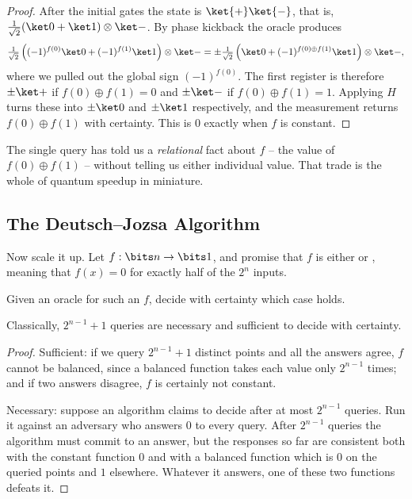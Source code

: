 \begin{proof}
	After the initial gates the state is $\ket{+}\ket{-}$, that is, $\tfrac1{\sqrt2}(\ket0+\ket1)\otimes\ket-$. By phase kickback the oracle produces
	$$\tfrac{1}{\sqrt2}\left((-1)^{f(0)}\ket0 + (-1)^{f(1)}\ket1\right)\otimes\ket-= \pm\tfrac{1}{\sqrt2}\left(\ket0+(-1)^{f(0)\oplus f(1)}\ket1\right)\otimes\ket-,$$
	where we pulled out the global sign $(-1)^{f(0)}$. The first register is therefore $\pm\ket+$ if $f(0)\oplus f(1) = 0$ and $\pm\ket-$ if $f(0)\oplus f(1)=1$. Applying $H$ turns these into $\pm\ket0$ and $\pm\ket1$ respectively, and the measurement returns $f(0)\oplus f(1)$ with certainty. This is $0$ exactly when $f$ is constant.
\end{proof}

The single query has told us a \emph{relational} fact about $f$ -- the value of $f(0)\oplus f(1)$ -- without telling us either individual value. That trade is the whole of quantum speedup in miniature.

\subsection{The Deutsch--Jozsa Algorithm}

Now scale it up. Let $f:\bits n\to\bits1$, and promise that $f$ is either  or , meaning that $f(x) = 0$ for exactly half of the $2^n$ inputs.

\begin{problem*}
	Given an oracle for such an $f$, decide with certainty which case holds.
\end{problem*}

\begin{proposition}
	Classically, $2^{n-1}+1$ queries are necessary and sufficient to decide with certainty.
\end{proposition}

\begin{proof}
	Sufficient: if we query $2^{n-1}+1$ distinct points and all the answers agree, $f$ cannot be balanced, since a balanced function takes each value only $2^{n-1}$ times; and if two answers disagree, $f$ is certainly not constant.

	Necessary: suppose an algorithm claims to decide after at most $2^{n-1}$ queries. Run it against an adversary who answers $0$ to every query. After $2^{n-1}$ queries the algorithm must commit to an answer, but the responses so far are consistent both with the constant function $0$ and with a balanced function which is $0$ on the queried points and $1$ elsewhere. Whatever it answers, one of these two functions defeats it.
\end{proof}

